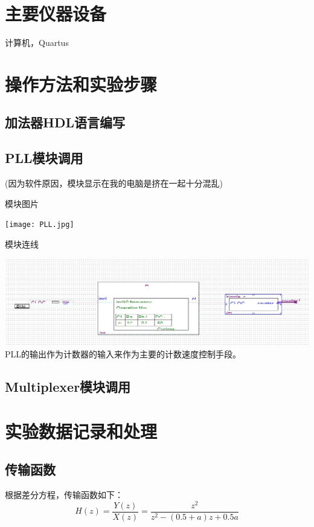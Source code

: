 \documentclass{zjureport}
\begin{document}
\section{主要仪器设备}
  计算机，Quartus

\section{操作方法和实验步骤}
  \subsection{加法器HDL语言编写}
    
  \subsection{PLL模块调用}
    (因为软件原因，模块显示在我的电脑是挤在一起十分混乱)
    \begin{clause}
      \item 模块图片
      \begin{center}
        \texttt{[image: PLL.jpg]}
      \end{center}
      \item 模块连线 
      \begin{center}
        \includegraphics[width=0.6\linewidth]{figures/Link_1.jpg}
        \\PLL的输出作为计数器的输入来作为主要的计数速度控制手段。
      \end{center}


    \end{clause}
  \subsection{Multiplexer模块调用}
    
\section{实验数据记录和处理}
  \subsection{传输函数}
    根据差分方程，传输函数如下：
    $$H(z) = \frac{Y(z)}{X(z)} = \frac{z^2}{z^2-(0.5+a)z+0.5a}$$
\end{document}
